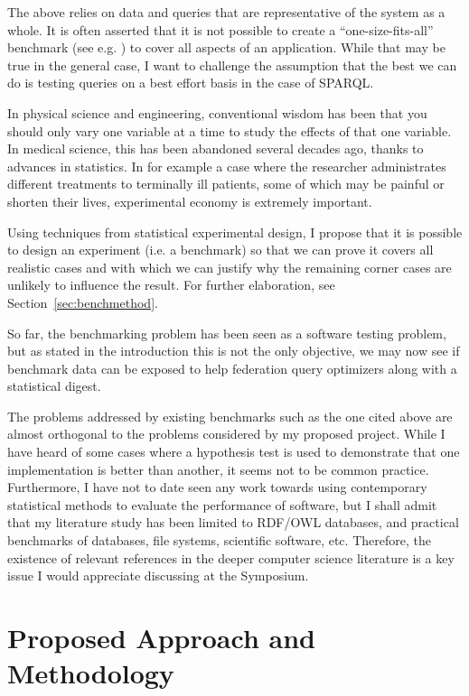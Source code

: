 \documentclass{llncs}
\begin{document}
The above relies on data and queries that are representative
of the system as a whole. It is often asserted that it is not possible
to create a ``one-size-fits-all'' benchmark (see
e.g. \cite{Schmidt:2011:FBS:2063016.2063054}) to cover all aspects of
an application. While that may be true in the general case, I want to
challenge the assumption that the best we can do is testing queries on
a best effort basis in the case of SPARQL.

In physical science and engineering, conventional wisdom has been that
you should only vary one variable at a time to study the effects of
that one variable. In medical science, this has been abandoned several
decades ago, thanks to advances in statistics. In for example a case where
the researcher administrates different treatments to terminally ill
patients, some of which may be painful or shorten their lives,
experimental economy is extremely important.

Using techniques from statistical experimental design, I propose
that it is possible to design an experiment (i.e. a benchmark) so that
we can prove it covers all realistic cases and with which we can justify
why the remaining corner cases are unlikely to influence the
result. For further elaboration, see Section~\ref{sec:benchmethod}.

So far, the benchmarking problem has been seen as a software testing
problem, but as stated in the introduction this is not the only
objective, we may now see if benchmark data can be exposed to help
federation query optimizers along with a statistical digest.

The problems addressed by existing benchmarks such as the one cited
above are almost orthogonal to the problems considered by my proposed
project. While I have heard of some cases where a hypothesis test is
used to demonstrate that one implementation is better than another, it
seems not to be common practice. Furthermore, I have not to date seen
any work towards using contemporary statistical methods to evaluate
the performance of software, but I shall admit that my literature
study has been limited to RDF/OWL databases, and practical benchmarks
of databases, file systems, scientific software, etc. Therefore, the
existence of relevant references in the deeper computer science
literature is a key issue I would appreciate discussing at the
Symposium.



\section{Proposed Approach and Methodology}
\end{document}
